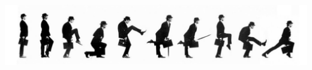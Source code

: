 \documentclass[
	12pt,				%
	openright,			%
	twoside,			%
	a4paper,			%
	english,			%
	french,				%
	brazil,				%
	sumario=tradicional
]{abntex2}
\begin{document}
\frenchspacing

\frontmatter

\begin{titlingpage}
\phantom{xxx}
\vspace{0.5cm}
\huge
\raggedright
\imprimirautor\\
\vspace{2.5cm}
\huge 
{\raggedleft
\includegraphics[scale=0.3]{MontyPythonSillyWalkDiagram.pdf}\\[1cm]
\textit{\textcolor{blue}{\imprimirtitulo}}\\[1cm]
}
\centering 
\vfill
\Large
\imprimirinstituicao
\end{titlingpage}
\end{document}
